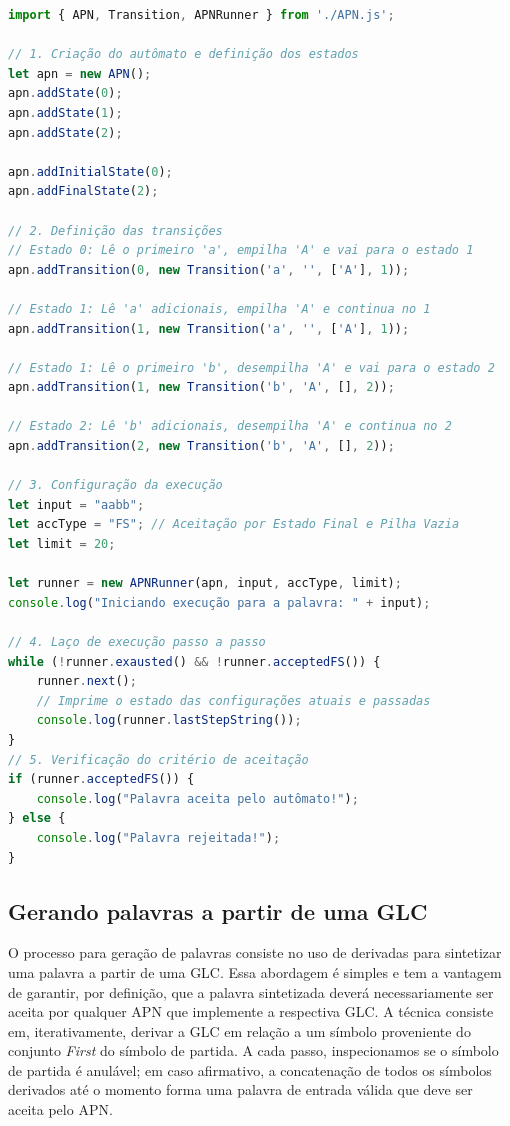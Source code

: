 \begin{lstlisting}[language=javascript]
import { APN, Transition, APNRunner } from './APN.js';

// 1. Criação do autômato e definição dos estados
let apn = new APN();
apn.addState(0);
apn.addState(1);
apn.addState(2);

apn.addInitialState(0);
apn.addFinalState(2);

// 2. Definição das transições
// Estado 0: Lê o primeiro 'a', empilha 'A' e vai para o estado 1
apn.addTransition(0, new Transition('a', '', ['A'], 1));

// Estado 1: Lê 'a' adicionais, empilha 'A' e continua no 1
apn.addTransition(1, new Transition('a', '', ['A'], 1));

// Estado 1: Lê o primeiro 'b', desempilha 'A' e vai para o estado 2
apn.addTransition(1, new Transition('b', 'A', [], 2));

// Estado 2: Lê 'b' adicionais, desempilha 'A' e continua no 2
apn.addTransition(2, new Transition('b', 'A', [], 2));

// 3. Configuração da execução
let input = "aabb";
let accType = "FS"; // Aceitação por Estado Final e Pilha Vazia
let limit = 20;

let runner = new APNRunner(apn, input, accType, limit);
console.log("Iniciando execução para a palavra: " + input);

// 4. Laço de execução passo a passo
while (!runner.exausted() && !runner.acceptedFS()) {
    runner.next();
    // Imprime o estado das configurações atuais e passadas
    console.log(runner.lastStepString());
}
// 5. Verificação do critério de aceitação
if (runner.acceptedFS()) {
    console.log("Palavra aceita pelo autômato!");
} else {
    console.log("Palavra rejeitada!");
}
\end{lstlisting}

\subsection{Gerando palavras a partir de uma GLC}\label{sec:gen}

O processo para geração de palavras consiste no uso de derivadas para sintetizar uma palavra a partir de uma GLC. Essa abordagem é simples e tem a vantagem de garantir, por definição, que a palavra sintetizada deverá necessariamente ser aceita por qualquer APN que implemente a respectiva GLC. A técnica consiste em, iterativamente, derivar a GLC em relação a um símbolo proveniente do conjunto \emph{First} do símbolo de partida. A cada passo, inspecionamos se o símbolo de partida é anulável; em caso afirmativo, a concatenação de todos os símbolos derivados até o momento forma uma palavra de entrada válida que deve ser aceita pelo APN.

